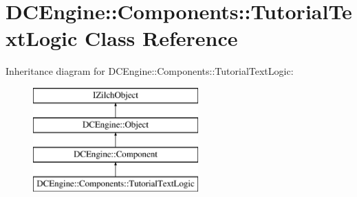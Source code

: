 \hypertarget{classDCEngine_1_1Components_1_1TutorialTextLogic}{\section{D\-C\-Engine\-:\-:Components\-:\-:Tutorial\-Text\-Logic Class Reference}
\label{classDCEngine_1_1Components_1_1TutorialTextLogic}
}
Inheritance diagram for D\-C\-Engine\-:\-:Components\-:\-:Tutorial\-Text\-Logic\-:\begin{figure}[H]
\begin{center}
\leavevmode
\includegraphics[height=4.000000cm]{classDCEngine_1_1Components_1_1TutorialTextLogic}
\end{center}
\end{figure}
